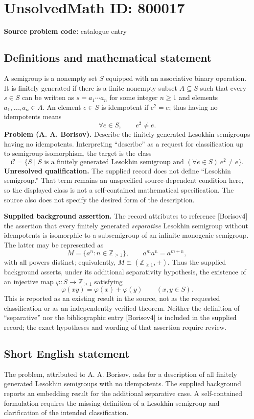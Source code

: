 \documentclass[11pt]{article}
\begin{document}
\section*{UnsolvedMath ID: 800017}
\textbf{Source problem code:} catalogue entry
\subsection{Definitions and mathematical statement}
A semigroup is a nonempty set \(S\) equipped with an associative binary operation. It is finitely generated if there is a finite nonempty subset \(A\subseteq S\) such that every \(s\in S\) can be written as \(s=a_1\cdots a_n\) for some integer \(n\geq 1\) and elements \(a_1,\ldots,a_n\in A\). An element \(e\in S\) is idempotent if \(e^2=e\); thus having no idempotents means
\[
\forall e\in S,\qquad e^2\neq e.
\]
\textbf{Problem (A. A. Borisov).} Describe the finitely generated Lesokhin semigroups having no idempotents. Interpreting ``describe'' as a request for classification up to semigroup isomorphism, the target is the class
\[
\mathcal C=\{S\mid S\text{ is a finitely generated Lesokhin semigroup and }(\forall e\in S)\ e^2\neq e\}.
\]
\textbf{Unresolved qualification.} The supplied record does not define ``Lesokhin semigroup.'' That term remains an unspecified source-dependent condition here, so the displayed class is not a self-contained mathematical specification. The source also does not specify the desired form of the description.

\textbf{Supplied background assertion.} The record attributes to reference [Borisov4] the assertion that every finitely generated \emph{separative} Lesokhin semigroup without idempotents is isomorphic to a subsemigroup of an infinite monogenic semigroup. The latter may be represented as
\[
M=\{a^n:n\in\mathbb Z_{\geq 1}\},\qquad a^m a^n=a^{m+n},
\]
with all powers distinct; equivalently, \(M\cong(\mathbb Z_{\geq 1},+)\). Thus the supplied background asserts, under its additional separativity hypothesis, the existence of an injective map \(\varphi:S\to\mathbb Z_{\geq 1}\) satisfying
\[
\varphi(xy)=\varphi(x)+\varphi(y)\qquad(x,y\in S).
\]
This is reported as an existing result in the source, not as the requested classification or as an independently verified theorem. Neither the definition of ``separative'' nor the bibliographic entry [Borisov4] is included in the supplied record; the exact hypotheses and wording of that assertion require review.
\subsection{Short English statement}
The problem, attributed to A. A. Borisov, asks for a description of all finitely generated Lesokhin semigroups with no idempotents. The supplied background reports an embedding result for the additional separative case. A self-contained formulation requires the missing definition of a Lesokhin semigroup and clarification of the intended classification.
\end{document}
